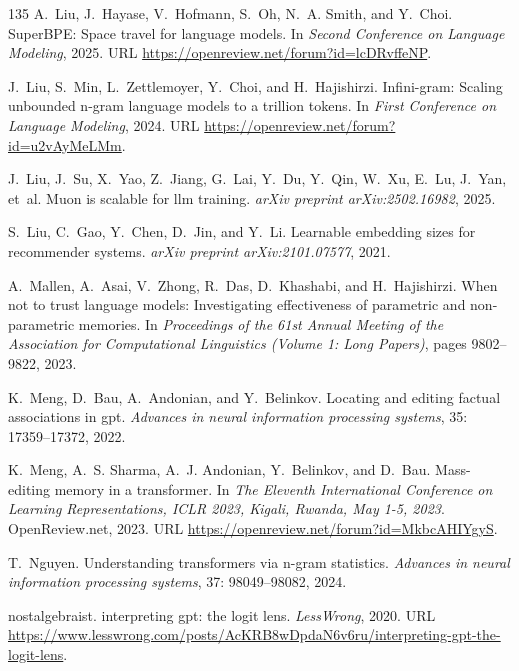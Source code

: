 \begin{thebibliography}{135}
A.~Liu, J.~Hayase, V.~Hofmann, S.~Oh, N.~A. Smith, and Y.~Choi.
\newblock Super{BPE}: Space travel for language models.
\newblock In \emph{Second Conference on Language Modeling}, 2025{}.
\newblock URL \url{https://openreview.net/forum?id=lcDRvffeNP}.

J.~Liu, S.~Min, L.~Zettlemoyer, Y.~Choi, and H.~Hajishirzi.
\newblock Infini-gram: Scaling unbounded n-gram language models to a trillion
  tokens.
\newblock In \emph{First Conference on Language Modeling}, 2024{}.
\newblock URL \url{https://openreview.net/forum?id=u2vAyMeLMm}.

J.~Liu, J.~Su, X.~Yao, Z.~Jiang, G.~Lai, Y.~Du, Y.~Qin, W.~Xu, E.~Lu, J.~Yan,
  et~al.
\newblock Muon is scalable for llm training.
\newblock \emph{arXiv preprint arXiv:2502.16982}, 2025{}.

S.~Liu, C.~Gao, Y.~Chen, D.~Jin, and Y.~Li.
\newblock Learnable embedding sizes for recommender systems.
\newblock \emph{arXiv preprint arXiv:2101.07577}, 2021.

A.~Mallen, A.~Asai, V.~Zhong, R.~Das, D.~Khashabi, and H.~Hajishirzi.
\newblock When not to trust language models: Investigating effectiveness of
  parametric and non-parametric memories.
\newblock In \emph{Proceedings of the 61st Annual Meeting of the Association
  for Computational Linguistics (Volume 1: Long Papers)}, pages 9802--9822,
  2023.

K.~Meng, D.~Bau, A.~Andonian, and Y.~Belinkov.
\newblock Locating and editing factual associations in gpt.
\newblock \emph{Advances in neural information processing systems},
  35: 17359--17372, 2022.

K.~Meng, A.~S. Sharma, A.~J. Andonian, Y.~Belinkov, and D.~Bau.
\newblock Mass-editing memory in a transformer.
\newblock In \emph{The Eleventh International Conference on Learning
  Representations, {ICLR} 2023, Kigali, Rwanda, May 1-5, 2023}. OpenReview.net,
  2023.
\newblock URL \url{https://openreview.net/forum?id=MkbcAHIYgyS}.

T.~Nguyen.
\newblock Understanding transformers via n-gram statistics.
\newblock \emph{Advances in neural information processing systems},
  37: 98049--98082, 2024.

nostalgebraist.
\newblock interpreting gpt: the logit lens.
\newblock \emph{LessWrong}, 2020.
\newblock URL
  \url{https://www.lesswrong.com/posts/AcKRB8wDpdaN6v6ru/interpreting-gpt-the-logit-lens}.


\end{thebibliography}
